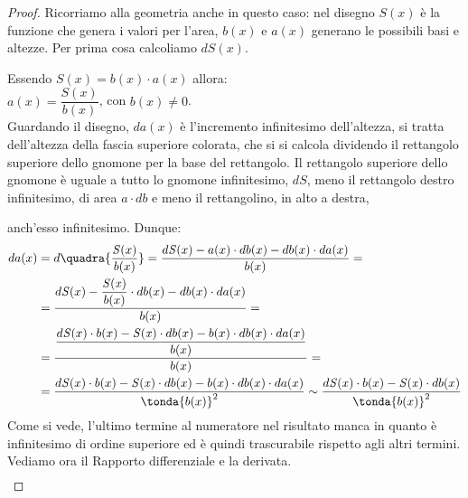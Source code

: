 \begin{proof}
Ricorriamo alla geometria anche in questo caso: nel disegno 
\(\mathit{S}(x)\) è la funzione che genera i valori per l'area, \(b(x)\) 
e \(a(x)\) generano le possibili basi e altezze. 
Per prima cosa calcoliamo \(d\mathit{S}(x)\).

\noindent \begin{minipage}[]{.48 \textwidth}
Essendo \(\mathit{S}(x)=b(x) \cdot a(x)\) allora:\\ 
\(a(x)=\dfrac{S(x)}{b(x)}\), con \(b(x)\neq 0\).\\
Guardando il disegno, \(da(x)\) è l'incremento infinitesimo dell'altezza, si 
tratta dell'altezza della fascia superiore colorata, che si si calcola
dividendo il rettangolo superiore dello gnomone per la base del rettangolo.
Il rettangolo superiore dello gnomone è uguale a tutto lo gnomone 
infinitesimo, \(d\mathit{S}\), meno il rettangolo destro infinitesimo, 
di area \(a\cdot db\) e meno il rettangolino, in alto a destra,
\end{minipage} 
 \hfill
 \begin{minipage}[]{.48 \textwidth}
 \begin{center}
 \begin{inaccessibleblock}
  \differenzialerapporto
 \end{inaccessibleblock}
 \end{center}
\end{minipage}
anch'esso infinitesimo. Dunque:
\begin{align*}
da(x) &= d\quadra{\frac{\mathit{S}(x)}{b(x)}}=
 \frac{d\mathit{S}(x) - a(x) \cdot db(x) - db(x) \cdot da(x)}{b(x)}=\\
 &=\frac{d\mathit{S}(x) - \dfrac{\mathit{S(x)}}{b(x)} \cdot db(x) - 
          db(x) \cdot da(x)}{b(x)}=\\
 &=\frac{\dfrac{d\mathit{S}(x) \cdot b(x) - \mathit{S(x)} \cdot db(x) -
               b(x) \cdot db(x) \cdot da(x)}{b(x)}}{b(x)}=\\
 &=\frac{d\mathit{S}(x) \cdot b(x) - \mathit{S(x)} \cdot db(x) -
              b(x) \cdot db(x) \cdot da(x)}{\tonda{b(x)}^2} \sim 
 \frac{d\mathit{S}(x) \cdot b(x) - \mathit{S(x)} \cdot db(x)}
      {\tonda{b(x)}^2}
\end{align*}
Come si vede, l'ultimo termine al numeratore nel risultato manca in quanto 
è infinitesimo di ordine superiore ed è quindi trascurabile rispetto agli 
altri termini. 
Vediamo ora il Rapporto differenziale e la derivata.
\begin{align*}

\end{align*}
\end{proof}
